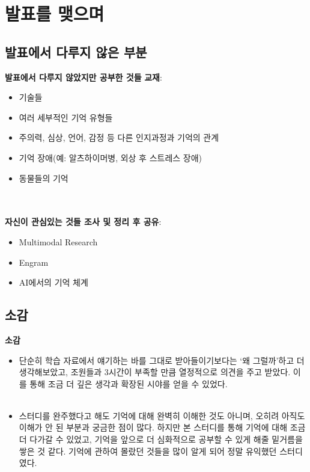 \documentclass{beamer}
\begin{document}
\section{발표를 맺으며}
\subsection{발표에서 다루지 않은 부분}
\begin{frame}{\textbf{발표에서 다루지 않았지만 공부한 것들}}
  \large
  \textbf{교재}:
  \begin{itemize}
    \item 기술들
    \item 여러 세부적인 기억 유형들
    \item 주의력, 심상, 언어, 감정 등 다른 인지과정과 기억의 관계
    \item 기억 장애(예: 알츠하이머병, 외상 후 스트레스 장애)
    \item 동물들의 기억
  \end{itemize}\\~\\

  \textbf{자신이 관심있는 것들 조사 및 정리 후 공유}:
  \begin{itemize}
    \item Multimodal Research
    \item Engram
    \item AI에서의 기억 체계
  \end{itemize}
\end{frame}

\subsection{소감}
\begin{frame}{\textbf{소감}}
  \begin{itemize}
    \large
    \item 단순히 학습 자료에서 얘기하는 바를 그대로 받아들이기보다는 `왜 그럴까'하고 더 생각해보았고, 조원들과 3시간이 부족할 만큼 열정적으로 의견을 주고 받았다. 
      이를 통해 조금 더 깊은 생각과 확장된 시야를 얻을 수 있었다.\\~\\
    \item 스터디를 완주했다고 해도 기억에 대해 완벽히 이해한 것도 아니며, 오히려 아직도 이해가 안 된 부분과 궁금한 점이 많다. 하지만 본 스터디를 통해 기억에 대해 조금 더 다가갈 수 있었고, 기억을 앞으로 더 심화적으로 공부할 수 있게 해줄 밑거름을 쌓은 것 같다. 기억에 관하여 몰랐던 것들을 많이 알게 되어 정말 유익했던 스터디였다.
  \end{itemize}
\end{frame}
\end{document}
